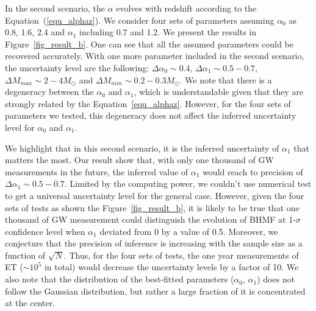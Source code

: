 \documentclass[twocolumn]{aastex62}
\newcommand{\blue}[1]{{#1}}
\begin{document}
In the second scenario, the $\alpha$ evolves with redshift according to the Equation~(\ref{equ_alphaz}). \blue{We consider four sets of parameters assuming $\alpha_0$ as  0.8, 1.6, 2.4 and $\alpha_1$ including 0.7 and 1.2. We present the results in Figure~\ref{fig_result_b}. One can see that all the assumed parameters could be recovered accurately. With one more parameter included in the second scenario, the uncertainty level are the following: $\Delta\alpha_0\sim0.4$, $\Delta\alpha_1\sim0.5-0.7$, $\Delta M_{max}\sim2-4M_{\odot}$ and $\Delta M_{min}\sim0.2-0.3M_{\odot}$. We note that there is a degeneracy between the $\alpha_0$ and $\alpha_1$, which is understandable given that they are strongly related by the Equation~\ref{equ_alphaz}. However, for the four sets of parameters we tested, this degeneracy does not affect the inferred uncertainty level for $\alpha_0$ and $\alpha_1$.
}

We highlight that in this \blue{second} scenario, it is the inferred uncertainty of $\alpha_1$ that matters the most. \blue{Our result show that, with only one thousand of GW measurements in the future, the inferred value of $\alpha_1$ would reach to precision of $\Delta\alpha_1\sim0.5-0.7$. Limited by the computing power, we couldn't use numerical test to get a universal uncertainty level for the general case. However, given the four sets of tests as shown the Figure~\ref{fig_result_b}, it is likely to be true that one thousand of GW measurement could distinguish the evolution of BHMF at 1-$\sigma$ confidence level when $\alpha_1$ deviated from 0 by a value of 0.5. 
Moreover, we conjecture that the precision of inference is increasing with the sample size as a function of $\sqrt{N}$. Thus, for the four sets of tests, the one year measurements of ET ($\sim10^5$ in total) would decrease the uncertainty levels by a factor of 10.}
We also note that the distribution of the best-fitted parameters ($\alpha_0$, $\alpha_1$) does not follow the Gaussian distribution, but rather a large fraction of it is concentrated at the center.
\end{document}
